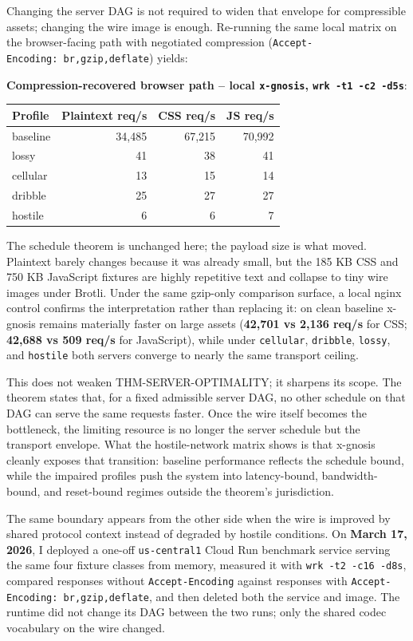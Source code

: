 \documentclass[
  11pt,
]{article}
\newcounter{none} %
\begin{document}
Changing the server DAG is not required to widen that envelope for
compressible assets; changing the wire image is enough. Re-running the
same local matrix on the browser-facing path with negotiated compression
(\texttt{Accept-Encoding:\ br,gzip,deflate}) yields:

\textbf{Compression-recovered browser path -- local \texttt{x-gnosis},
\texttt{wrk\ -t1\ -c2\ -d5s}}:

{\def\LTcaptype{none} %
\begin{longtable}[]{@{}lrrr@{}}
\toprule\noalign{}
Profile & Plaintext req/s & CSS req/s & JS req/s \\
\midrule\noalign{}
\endhead
\bottomrule\noalign{}
\endlastfoot
baseline & 34,485 & 67,215 & 70,992 \\
lossy & 41 & 38 & 41 \\
cellular & 13 & 15 & 14 \\
dribble & 25 & 27 & 27 \\
hostile & 6 & 6 & 7 \\
\end{longtable}
}

The schedule theorem is unchanged here; the payload size is what moved.
Plaintext barely changes because it was already small, but the 185 KB
CSS and 750 KB JavaScript fixtures are highly repetitive text and
collapse to tiny wire images under Brotli. Under the same gzip-only
comparison surface, a local nginx control confirms the interpretation
rather than replacing it: on clean baseline x-gnosis remains materially
faster on large assets (\textbf{42,701 vs 2,136 req/s} for CSS;
\textbf{42,688 vs 509 req/s} for JavaScript), while under
\texttt{cellular}, \texttt{dribble}, \texttt{lossy}, and
\texttt{hostile} both servers converge to nearly the same transport
ceiling.

This does not weaken THM-SERVER-OPTIMALITY; it sharpens its scope. The
theorem states that, for a fixed admissible server DAG, no other
schedule on that DAG can serve the same requests faster. Once the wire
itself becomes the bottleneck, the limiting resource is no longer the
server schedule but the transport envelope. What the hostile-network
matrix shows is that x-gnosis cleanly exposes that transition: baseline
performance reflects the schedule bound, while the impaired profiles
push the system into latency-bound, bandwidth-bound, and reset-bound
regimes outside the theorem's jurisdiction.

The same boundary appears from the other side when the wire is improved
by shared protocol context instead of degraded by hostile conditions. On
\textbf{March 17, 2026}, I deployed a one-off \texttt{us-central1} Cloud
Run benchmark service serving the same four fixture classes from memory,
measured it with \texttt{wrk\ -t2\ -c16\ -d8s}, compared responses
without \texttt{Accept-Encoding} against responses with
\texttt{Accept-Encoding:\ br,gzip,deflate}, and then deleted both the
service and image. The runtime did not change its DAG between the two
runs; only the shared codec vocabulary on the wire changed.
\end{document}
